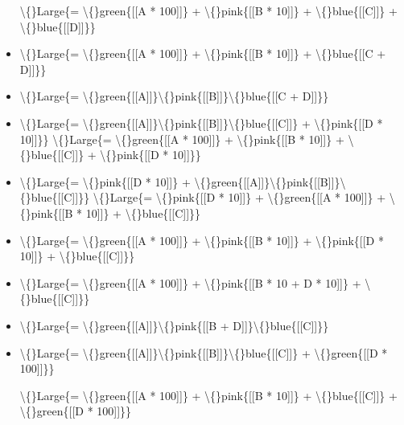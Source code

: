 \documentclass{article}
\begin{document}
\begin{itemize}
                        \textbackslash\{\}Large\{= \textbackslash\{\}green\{[[A * 100]]\} + \textbackslash\{\}pink\{[[B * 10]]\} + \textbackslash\{\}blue\{[[C]]\} + \textbackslash\{\}blue\{[[D]]\}\}
  \item \textbackslash\{\}Large\{= \textbackslash\{\}green\{[[A * 100]]\} + \textbackslash\{\}pink\{[[B * 10]]\} + \textbackslash\{\}blue\{[[C + D]]\}\}
  \item \textbackslash\{\}Large\{= \textbackslash\{\}green\{[[A]]\}\textbackslash\{\}pink\{[[B]]\}\textbackslash\{\}blue\{[[C + D]]\}\}
  \item \textbackslash\{\}Large\{= \textbackslash\{\}green\{[[A]]\}\textbackslash\{\}pink\{[[B]]\}\textbackslash\{\}blue\{[[C]]\} + \textbackslash\{\}pink\{[[D * 10]]\}\}
                        \textbackslash\{\}Large\{= \textbackslash\{\}green\{[[A * 100]]\} + \textbackslash\{\}pink\{[[B * 10]]\} + \textbackslash\{\}blue\{[[C]]\} + \textbackslash\{\}pink\{[[D * 10]]\}\}
  \item \textbackslash\{\}Large\{= \textbackslash\{\}pink\{[[D * 10]]\} + \textbackslash\{\}green\{[[A]]\}\textbackslash\{\}pink\{[[B]]\}\textbackslash\{\}blue\{[[C]]\}\}
                        \textbackslash\{\}Large\{= \textbackslash\{\}pink\{[[D * 10]]\} + \textbackslash\{\}green\{[[A * 100]]\} + \textbackslash\{\}pink\{[[B * 10]]\} + \textbackslash\{\}blue\{[[C]]\}\}
  \item \textbackslash\{\}Large\{= \textbackslash\{\}green\{[[A * 100]]\} + \textbackslash\{\}pink\{[[B * 10]]\} + \textbackslash\{\}pink\{[[D * 10]]\} + \textbackslash\{\}blue\{[[C]]\}\}
  \item \textbackslash\{\}Large\{= \textbackslash\{\}green\{[[A * 100]]\} + \textbackslash\{\}pink\{[[B * 10 + D * 10]]\} + \textbackslash\{\}blue\{[[C]]\}\}
  \item \textbackslash\{\}Large\{= \textbackslash\{\}green\{[[A]]\}\textbackslash\{\}pink\{[[B + D]]\}\textbackslash\{\}blue\{[[C]]\}\}
  \item \textbackslash\{\}Large\{= \textbackslash\{\}green\{[[A]]\}\textbackslash\{\}pink\{[[B]]\}\textbackslash\{\}blue\{[[C]]\} + \textbackslash\{\}green\{[[D * 100]]\}\}
                            
                                \textbackslash\{\}Large\{= \textbackslash\{\}green\{[[A * 100]]\} + \textbackslash\{\}pink\{[[B * 10]]\} + \textbackslash\{\}blue\{[[C]]\} + \textbackslash\{\}green\{[[D * 100]]\}\}
                            

\end{itemize}
\end{document}
